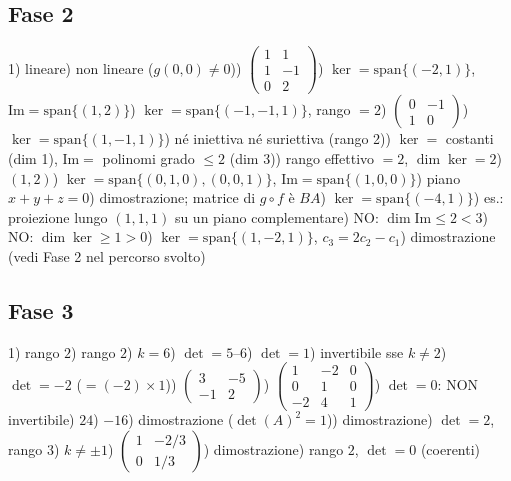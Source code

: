\documentclass[a4paper,11pt]{article}
\begin{document}
\subsection*{Fase 2}
\footnotesize
1) lineare) non lineare ($g(0,0)\neq0$)) $\begin{pmatrix}1&1\\1&-1\\0&2\end{pmatrix}$) $\ker=\mathrm{span}\{(-2,1)\}$, $\mathrm{Im}=\mathrm{span}\{(1,2)\}$) $\ker=\mathrm{span}\{(-1,-1,1)\}$, rango $=2$) $\begin{pmatrix}0&-1\\1&0\end{pmatrix}$) $\ker=\mathrm{span}\{(1,-1,1)\}$) né iniettiva né suriettiva (rango 2)) $\ker=$ costanti (dim 1), $\mathrm{Im}=$ polinomi grado $\le2$ (dim 3)) rango effettivo $=2$, $\dim\ker=2$) $(1,2)$) $\ker=\mathrm{span}\{(0,1,0),(0,0,1)\}$, $\mathrm{Im}=\mathrm{span}\{(1,0,0)\}$) piano $x+y+z=0$) dimostrazione; matrice di $g\circ f$ è $BA$) $\ker=\mathrm{span}\{(-4,1)\}$) es.: proiezione lungo $(1,1,1)$ su un piano complementare) NO: $\dim\mathrm{Im}\le2<3$) NO: $\dim\ker\ge1>0$) $\ker=\mathrm{span}\{(1,-2,1)\}$, $c_3=2c_2-c_1$) dimostrazione (vedi Fase 2 nel percorso svolto)
\normalsize

\subsection*{Fase 3}
\footnotesize
1) rango $2$) rango $2$) $k=6$) $\det=5$--6) $\det=1$) invertibile sse $k\neq2$) $\det=-2$ ($=(-2)\times1$)) $\begin{pmatrix}3&-5\\-1&2\end{pmatrix}$) $\begin{pmatrix}1&-2&0\\0&1&0\\-2&4&1\end{pmatrix}$) $\det=0$: NON invertibile) $24$) $-16$) dimostrazione ($\det(A)^2=1$)) dimostrazione) $\det=2$, rango $3$) $k\neq\pm1$) $\begin{pmatrix}1&-2/3\\0&1/3\end{pmatrix}$) dimostrazione) rango $2$, $\det=0$ (coerenti)
\normalsize
\end{document}

